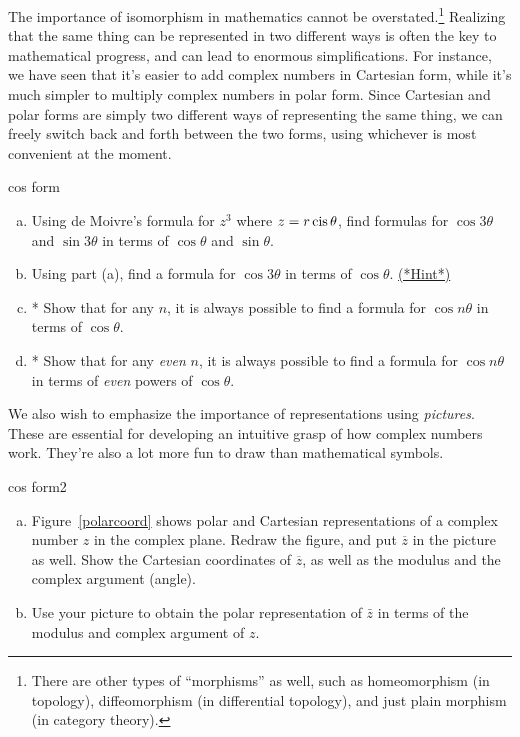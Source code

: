 The importance of isomorphism in mathematics cannot be overstated.\footnote{There are other types of ``morphisms'' as well, such as homeomorphism (in topology), diffeomorphism (in differential topology), and just plain morphism (in category theory).}  Realizing that the same thing can be represented in two different ways is often the key to mathematical progress, and can lead to enormous simplifications. For instance, we have seen that it's  easier to add complex numbers in Cartesian form, while it's much simpler to multiply complex numbers in polar form.  Since Cartesian and polar forms  are simply two different ways of representing the same thing, we can freely switch back and forth between the two forms, using whichever is most convenient at the moment. 

\begin{exercise}{cos form}
\begin{enumerate}[(a)]
 \item
Using de Moivre's formula for $z^3$ where $z = r \operatorname{cis} \theta$, find formulas for $\cos 3 \theta$ and $\sin 3 \theta$ in terms of $\cos \theta$ and $\sin \theta$.  
\item
Using part (a), find a formula for $\cos 3 \theta$ in terms of $\cos \theta$.  
\hyperref[sec:complex:hints]{(*Hint*)}
\item
* Show that for any $n$, it is always possible to find a formula for $\cos n\theta$ in terms of $\cos \theta$.
\item
* Show that for any \emph{even} $n$, it is always possible to find a formula for $\cos n\theta$ in terms of \emph{even} powers of $\cos \theta$.
\end{enumerate}
\end{exercise}

We also wish to emphasize the importance of representations using \emph{pictures}.  These are essential for developing an intuitive grasp of how complex numbers work. They're also a lot more fun to draw than mathematical symbols. 

\begin{exercise}{cos form2}
\begin{enumerate}[(a)]
\item
Figure~\ref{polarcoord} shows  polar and Cartesian representations of a complex number $z$  in the complex plane.  Redraw the figure, and put $\overline{z}$ in the picture as well. Show the Cartesian coordinates of $\overline{z}$, as well as the modulus and the complex argument (angle).
\item
Use your picture to obtain the polar representation of $\bar{z}$ in terms of the modulus and complex argument of $z$.
\end{enumerate}
\end{exercise}

